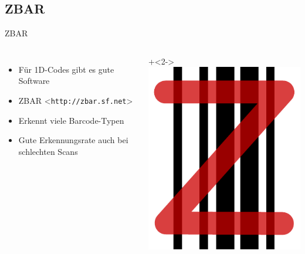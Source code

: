 \subsection{ZBAR}
\begin{frame}{ZBAR}
	\begin{columns}
		\begin{itemize}
		\item<1-> Für 1D-Codes gibt es gute Software
		\item<2-> ZBAR <\texttt{http://zbar.sf.net}>
		\item<3-> Erkennt viele Barcode-Typen
		\item<4-> Gute Erkennungsrate auch bei schlechten Scans
		\end{itemize}
		\onslide+<2->\includegraphics[width=\textwidth]{penma/others/zbar.pdf}
	\end{columns}
\end{frame}

